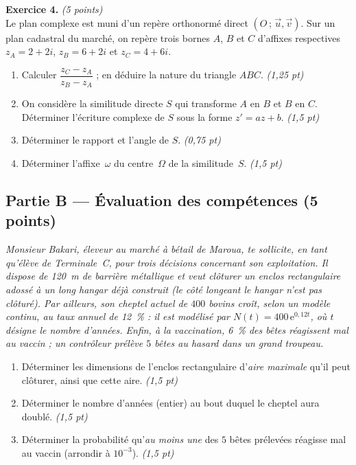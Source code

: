 \smallskip
\noindent\textbf{Exercice 4.} \hfill\textit{(5 points)}\\
Le plan complexe est muni d'un repère orthonormé direct $(O\,;\,\vec u,\vec v)$. Sur un
plan cadastral du marché, on repère trois bornes $A$, $B$ et $C$ d'affixes respectives
$z_A=2+2i$, $z_B=6+2i$ et $z_C=4+6i$.
\begin{enumerate}[label=\arabic*)]
\item Calculer $\dfrac{z_C-z_A}{z_B-z_A}$ ; en déduire la nature du triangle $ABC$. \hfill\textit{(1,25 pt)}
\item On considère la similitude directe $S$ qui transforme $A$ en $B$ et $B$ en $C$.
Déterminer l'écriture complexe de $S$ sous la forme $z'=az+b$. \hfill\textit{(1,5 pt)}
\item Déterminer le rapport et l'angle de $S$. \hfill\textit{(0,75 pt)}
\item Déterminer l'affixe~$\omega$ du centre~$\Omega$ de la similitude~$S$. \hfill\textit{(1,5 pt)}
\end{enumerate}

\subsection*{Partie B — Évaluation des compétences \hfill (5 points)}

\noindent\textit{Monsieur Bakari, éleveur au marché à bétail de Maroua, te sollicite, en
tant qu'élève de Terminale~C, pour trois décisions concernant son exploitation. Il dispose
de \SI{120}{\metre} de barrière métallique et veut clôturer un enclos rectangulaire
\emph{adossé à un long hangar} déjà construit (le côté longeant le hangar n'est pas
clôturé). Par ailleurs, son cheptel actuel de $400$ bovins croît, selon un modèle continu,
au taux annuel de \SI{12}{\percent} : il est modélisé par $N(t)=400\,\mathrm{e}^{0{,}12t}$,
où $t$ désigne le nombre d'années. Enfin, à la vaccination, \SI{6}{\percent} des bêtes
réagissent mal au vaccin ; un contrôleur prélève $5$ bêtes au hasard dans un grand
troupeau.}

\begin{enumerate}[label=\textbf{Tâche \arabic*.},leftmargin=2.4em]
\item Déterminer les dimensions de l'enclos rectangulaire d'\emph{aire maximale} qu'il
peut clôturer, ainsi que cette aire. \hfill\textit{(1,5 pt)}
\item Déterminer le nombre d'années (entier) au bout duquel le cheptel aura doublé. \hfill\textit{(1,5 pt)}
\item Déterminer la probabilité qu'\emph{au moins une} des $5$ bêtes prélevées réagisse
mal au vaccin (arrondir à $10^{-3}$). \hfill\textit{(1,5 pt)}
\end{enumerate}
\par{}

